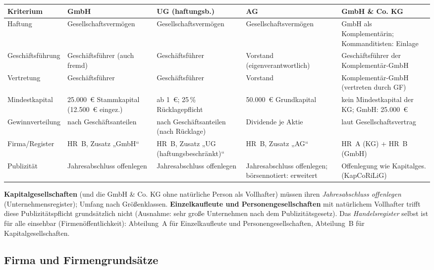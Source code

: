 \documentclass[11pt, a4paper]{article}
\begin{document}
\begin{center}
\small
\begin{tabular}{p{2.6cm} p{3.1cm} p{2.9cm} p{2.8cm} p{2.8cm}}
\toprule
\textbf{Kriterium} & \textbf{GmbH} & \textbf{UG (haftungsb.)} & \textbf{AG} & \textbf{GmbH \& Co. KG}\\
\midrule
Haftung & Gesellschaftsvermögen & Gesellschaftsvermögen & Gesellschaftsvermögen & GmbH als Komplementärin; Kommanditisten: Einlage\\
\addlinespace
Geschäftsführung & Geschäftsführer (auch fremd) & Geschäftsführer & Vorstand (eigenverantwortlich) & Geschäftsführer der Komplementär-GmbH\\
\addlinespace
Vertretung & Geschäftsführer & Geschäftsführer & Vorstand & Komplementär-GmbH (vertreten durch GF)\\
\addlinespace
Mindestkapital & 25.000~€ Stammkapital (12.500~€ eingez.) & ab 1~€; 25\,\% Rücklagepflicht & 50.000~€ Grundkapital & kein Mindestkapital der KG; GmbH: 25.000~€\\
\addlinespace
Gewinnverteilung & nach Geschäftsanteilen & nach Geschäftsanteilen (nach Rücklage) & Dividende je Aktie & laut Gesellschaftsvertrag\\
\addlinespace
Firma/Register & HR~B, Zusatz „GmbH`` & HR~B, Zusatz „UG (haftungsbeschränkt)`` & HR~B, Zusatz „AG`` & HR~A (KG) + HR~B (GmbH)\\
\addlinespace
Publizität & Jahresabschluss offenlegen & Jahresabschluss offenlegen & Jahresabschluss offenlegen; börsennotiert: erweitert & Offenlegung wie Kapitalges. (KapCoRiLiG)\\
\bottomrule
\end{tabular}
\end{center}

\begin{merksatz}[title={\bfseries Publizität}]
\textbf{Kapitalgesellschaften} (und die GmbH \& Co. KG ohne natürliche Person als
Vollhafter) müssen ihren \emph{Jahresabschluss offenlegen} (Unternehmensregister);
Umfang nach Größenklassen. \textbf{Einzelkaufleute und Personengesellschaften} mit
natürlichem Vollhafter trifft diese Publizitätspflicht grundsätzlich nicht (Ausnahme:
sehr große Unternehmen nach dem Publizitätsgesetz). Das \emph{Handelsregister} selbst ist
für alle einsehbar (Firmenöffentlichkeit): Abteilung~A für Einzelkaufleute und
Personengesellschaften, Abteilung~B für Kapitalgesellschaften.
\end{merksatz}

\subsection{Firma und Firmengrundsätze}
\end{document}
